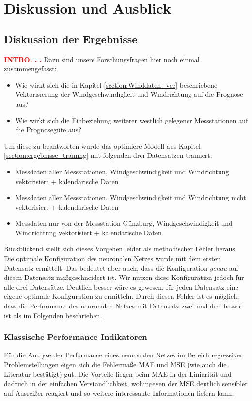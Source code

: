 \documentclass[
12pt, %
toc=listofnumbered, %
toc=chapterentrydotfill, %
numbers=noenddot, %
captions=tableheading, %
bibliography=numbered
]{scrreprt}
\let\Oldsection\section
\renewcommand{\section}{\FloatBarrier\Oldsection}
\let\Oldsubsection\subsection
\renewcommand{\subsection}{\FloatBarrier\Oldsubsection}
\newcommand{\qm}[1]{\glqq#1\grqq{}} %
\newcommand{\highlight}[1]{\textbf{\textcolor{red}{#1}}}
\begin{document}
\chapter{Diskussion und Ausblick}

\section{Diskussion der Ergebnisse}
\highlight{INTRO. . .} Dazu sind unsere Forschungsfragen hier noch einmal zusammengefasst:

\begin{itemize}
	\item Wie wirkt sich die in Kapitel \ref{section:Winddaten_vec} beschriebene Vektorisierung der Windgeschwindigkeit und Windrichtung auf die Prognose aus?
	\item Wie wirkt sich die Einbeziehung weiterer westlich gelegener Messstationen auf die Prognosegüte aus?
\end{itemize}

Um diese zu beantworten wurde das optimiere Modell aus Kapitel \ref{section:ergebnisse_training} mit folgenden drei Datensätzen trainiert:

\begin{itemize}
	\item Messdaten aller Messstationen, Windgeschwindigkeit und Windrichtung vektorisiert + kalendarische Daten
	\item Messdaten aller Messstationen, Windgeschwindigkeit und Windrichtung nicht vektorisiert + kalendarische Daten
	\item Messdaten nur von der Messstation Günzburg, Windgeschwindigkeit und Windrichtung vektorisiert + kalendarische Daten
\end{itemize}

Rückblickend stellt sich dieses Vorgehen leider als methodischer Fehler heraus. Die optimale Konfiguration des neuronalen Netzes wurde mit dem ersten Datensatz ermittelt. Das bedeutet aber auch, dass die Konfiguration \textit{genau} auf diesen Datensatz \qm{maßgeschneidert} ist. Wir nutzen diese Konfiguration jedoch für alle drei Datensätze. Deutlich besser wäre es gewesen, für jeden Datensatz eine eigene optimale Konfiguration zu ermitteln. Durch diesen Fehler ist es möglich, dass die Performance des neuronalen Netzes mit Datensatz zwei und drei besser ist als im Folgenden beschrieben.

\subsection{Klassische Performance Indikatoren}
Für die Analyse der Performance eines neuronalen Netzes im Bereich regressiver Problemstellungen eigen sich die Fehlermaße MAE und MSE (wie auch die Literatur bestätigt) gut. Die Vorteile liegen beim MAE in der Liniarität und dadruch in der einfachen Verständlichkeit, wohingegen der MSE deutlich sensibler auf Ausreißer reagiert und so weitere interessante Informationen liefern kann.
\end{document}
